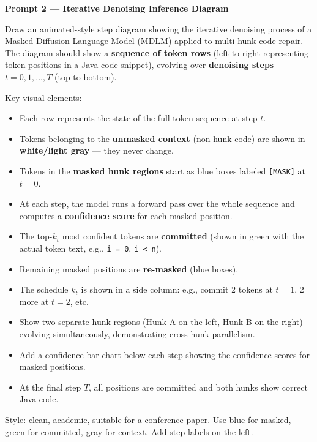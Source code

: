 \documentclass[11pt,a4paper]{article}
\begin{document}
\bigskip

\begin{mdframed}[linecolor=green!60!black, linewidth=1.2pt, roundcorner=6pt, backgroundcolor=green!4]
\textbf{Prompt 2 — Iterative Denoising Inference Diagram}

\medskip
Draw an animated-style step diagram showing the iterative denoising process of a Masked Diffusion Language Model (MDLM) applied to multi-hunk code repair. The diagram should show a \textbf{sequence of token rows} (left to right representing token positions in a Java code snippet), evolving over \textbf{denoising steps $t = 0, 1, \ldots, T$} (top to bottom).

Key visual elements:
\begin{itemize}
  \item Each row represents the state of the full token sequence at step $t$.
  \item Tokens belonging to the \textbf{unmasked context} (non-hunk code) are shown in \textbf{white/light gray} — they never change.
  \item Tokens in the \textbf{masked hunk regions} start as blue boxes labeled \texttt{[MASK]} at $t=0$.
  \item At each step, the model runs a forward pass over the whole sequence and computes a \textbf{confidence score} for each masked position.
  \item The top-$k_t$ most confident tokens are \textbf{committed} (shown in green with the actual token text, e.g., \texttt{i = 0}, \texttt{i < n}).
  \item Remaining masked positions are \textbf{re-masked} (blue boxes).
  \item The schedule $k_t$ is shown in a side column: e.g., commit 2 tokens at $t=1$, 2 more at $t=2$, etc.
  \item Show two separate hunk regions (Hunk A on the left, Hunk B on the right) evolving simultaneously, demonstrating cross-hunk parallelism.
  \item Add a confidence bar chart below each step showing the confidence scores for masked positions.
  \item At the final step $T$, all positions are committed and both hunks show correct Java code.
\end{itemize}

Style: clean, academic, suitable for a conference paper. Use blue for masked, green for committed, gray for context. Add step labels on the left.
\end{mdframed}
\end{document}
